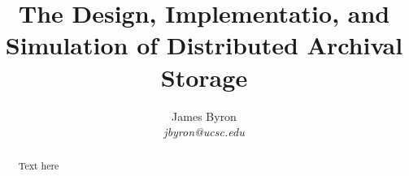\documentclass[10pt,twocolumn]{article}
\begin{document}
\title{The Design, Implementatio, and Simulation of Distributed Archival Storage}

\author{
{\rm James Byron} \\
\textit{jbyron@ucsc.edu}
}

\maketitle

\begin{abstract}
  Text here
\end{abstract}





\end{document}
